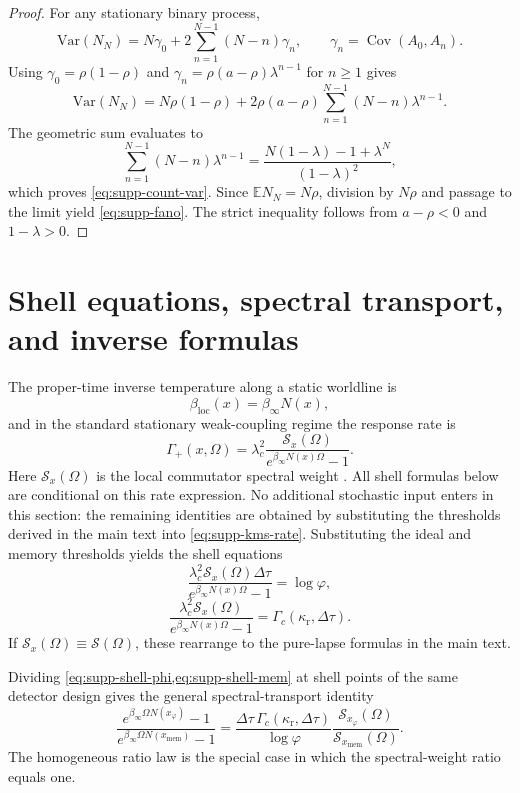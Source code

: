 \documentclass[11pt]{amsart}
\numberwithin{equation}{section}
\theoremstyle{remark}
\newcommand{\EE}{\mathbb{E}}
\newcommand{\Var}{\mathrm{Var}}
\begin{document}
\begin{proof}
For any stationary binary process,
\[
\Var(N_N)=N\gamma_0+2\sum_{n=1}^{N-1}(N-n)\gamma_n,
\qquad
\gamma_n=\operatorname{Cov}(A_0,A_n).
\]
Using $\gamma_0=\rho(1-\rho)$ and $\gamma_n=\rho(a-\rho)\lambda^{n-1}$ for $n\ge1$ gives
\[
\Var(N_N)=
N\rho(1-\rho)+2\rho(a-\rho)\sum_{n=1}^{N-1}(N-n)\lambda^{n-1}.
\]
The geometric sum evaluates to
\[
\sum_{n=1}^{N-1}(N-n)\lambda^{n-1}
=
\frac{N(1-\lambda)-1+\lambda^N}{(1-\lambda)^2},
\]
which proves \cref{eq:supp-count-var}. Since $\EE N_N=N\rho$, division by $N\rho$ and passage to the limit yield \cref{eq:supp-fano}. The strict inequality follows from $a-\rho<0$ and $1-\lambda>0$.
\end{proof}

\section{Shell equations, spectral transport, and inverse formulas}\label{sec:supp-kms}

The proper-time inverse temperature along a static worldline is
\[
\beta_{\mathrm{loc}}(x)=\beta_\infty N(x),
\]
and in the standard stationary weak-coupling regime the response rate is
\begin{equation}\label{eq:supp-kms-rate}
\Gamma_+(x,\Omega)=\lambda_c^2\frac{\mathcal S_x(\Omega)}{e^{\beta_\infty N(x)\Omega}-1}.
\end{equation}
Here $\mathcal S_x(\Omega)$ is the local commutator spectral weight \cite{LoukoSatz2008,KayWald1991,BuchholzSchlemmer2007,Solveen2012,GranseePinamontiVerch2017}. All shell formulas below are conditional on this rate expression. No additional stochastic input enters in this section: the remaining identities are obtained by substituting the thresholds derived in the main text into \eqref{eq:supp-kms-rate}.
Substituting the ideal and memory thresholds yields the shell equations
\begin{equation}\label{eq:supp-shell-phi}
\frac{\lambda_c^2\mathcal S_x(\Omega)\Delta\tau}{e^{\beta_\infty N(x)\Omega}-1}=\log\varphi,
\end{equation}
\begin{equation}\label{eq:supp-shell-mem}
\frac{\lambda_c^2\mathcal S_x(\Omega)}{e^{\beta_\infty N(x)\Omega}-1}=\Gamma_c(\kappa_{\mathrm r},\Delta\tau).
\end{equation}
If $\mathcal S_x(\Omega)\equiv\mathcal S(\Omega)$, these rearrange to the pure-lapse formulas in the main text.

Dividing \cref{eq:supp-shell-phi,eq:supp-shell-mem} at shell points of the same detector design gives the general spectral-transport identity
\begin{equation}\label{eq:supp-spectral-transport}
\frac{e^{\beta_\infty\Omega N(x_{\varphi})}-1}
     {e^{\beta_\infty\Omega N(x_{\mathrm{mem}})}-1}
=
\frac{\Delta\tau\,\Gamma_c(\kappa_{\mathrm r},\Delta\tau)}{\log\varphi}
\frac{\mathcal S_{x_{\varphi}}(\Omega)}{\mathcal S_{x_{\mathrm{mem}}}(\Omega)}.
\end{equation}
The homogeneous ratio law is the special case in which the spectral-weight ratio equals one.
\end{document}
